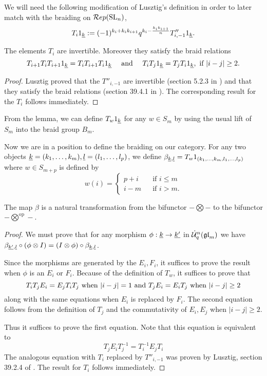 \documentclass[11pt]{amsart}
\begin{document}
We will need the following modification of Lusztig's definition in order to later match with the braiding on $ \mathcal{R}ep({\rm{SL}}_n) $,
$$ T_i 1_{{\underline{k}}} := (-1)^{k_i+k_i k_{i+1}} q^{k_i - \frac{k_i k_{i+1}}{n}} T''_{i,-1} 1_{{\underline{k}}}. $$

\begin{lem} \label{le:braid}
The elements $ T_i $ are invertible.  Moreover they satisfy the braid relations
$$ T_{i+1} T_{i} T_{i+1} 1_{{\underline{k}}} = T_i T_{i+1} T_i 1_{{\underline{k}}} \quad \text{ and } \quad T_i T_j 1_{{\underline{k}}} = T_j T_i 1_{{\underline{k}}}, \text{ if } |i - j| \ge 2. $$
\end{lem}
\begin{proof}
Lusztig proved that the $T''_{i,-1} $ are invertible (section 5.2.3 in \cite{MR1227098}) and that they satisfy the braid relations (section 39.4.1 in \cite{MR1227098}).  The corresponding result for the $ T_i $ follows immediately.
\end{proof}

From the lemma, we can define $ T_w 1_{{\underline{k}}} $ for any $ w\in S_m $ by using the usual lift of $ S_m $ into the braid group $ B_m $.

Now we are in a position to define the braiding on our category.  For any two objects $ {\underline{k}} = (k_1, \dots, k_m), {\underline{l}} = (l_1, \dots, l_p) $, we define $ \beta_{{\underline{k}}, {\underline{l}}} = T_w 1_{(k_1, \dots, k_m, l_1, \dots, l_p)} $ where $ w \in S_{m+p} $ is defined by
$$ w(i) = \begin{cases} p + i \ \ & \text{ if } i \le m  \\
 i - m \ \ & \text{ if } i > m.
 \end{cases}
 $$

\begin{lem} \label{le:natural}
The map $\beta $ is a natural transformation from the bifunctor $- \bigotimes -$ to the bifunctor $- \bigotimes^{\text{op}} -$.
\end{lem}

\begin{proof}
We must prove that for any morphism $ \phi : {\underline{k}} \rightarrow {\underline{k'}} $ in $\dot{{\mathcal{U}}}_q^n({\mathfrak{gl}}_m) $ we have $ \beta_{{\underline{k'}}, {\underline{l}}} \circ (\phi \otimes I) = (I \otimes \phi) \circ \beta_{{\underline{k}}, {\underline{l}}} $.

Since the morphisms are generated by the $E_i,F_i $, it suffices to prove the result when $ \phi $ is an $ E_i $ or $ F_i $.  Because of the definition of $ T_w$, it suffices to prove that
$$ T_i T_j E_i = E_j T_i T_j \text{ when $|i-j| = 1$ and } T_j E_i = E_i T_j \text{ when $ |i-j| \ge 2$} $$
along with the same equations when $E_i $ is replaced by $ F_i $.  The second equation follows from the definition of $T_j$ and the commutativity of $ E_i, E_j $ when $ |i-j| \ge 2 $.

Thus it suffices to prove the first equation.  Note that this equation is equivalent to
$$
T_j E_i T_j^{-1} = T_i^{-1} E_j T_i
$$
The analogous equation with $ T_i $ replaced by $ T''_{i,-1} $ was proven by Lusztig, section 39.2.4 of \cite{MR1227098}.  The result for $ T_i $ follows immediately.
\end{proof}
\end{document}
